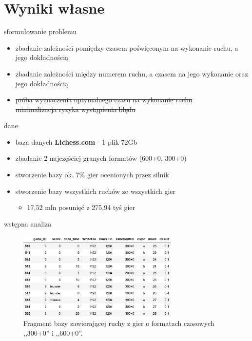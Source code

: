 \documentclass{beamer}
\begin{document}
\section{Wyniki własne}

\begin{frame}{sformułowanie problemu}
	\begin{itemize}
		\item zbadanie zależności pomiędzy czasem poświęconym na wykonanie ruchu, a jego dokładnością
		\item zbadanie zależności między numerem ruchu, a czasem na jego wykonanie oraz jego dokładnością
		\item \sout{próba wyznaczenia optymalnego czasu na wykonanie ruchu\\ minimalizacja ryzyka wystąpienia błędu} 
	\end{itemize}
\end{frame}

\begin{frame}{dane}
	\begin{itemize}
		\item baza danych \textbf{Lichess.com} - 1 plik 72Gb
		\item zbadanie 2 najczęściej granych formatów (600+0, 300+0)
		\item stworzenie bazy ok. 7\% gier ocenionych przez silnik
		\item stworzenie bazy wszystkich ruchów ze wszystkich gier
		\begin{itemize}
			\item 17,52 mln posunięć z 275,94 tyś gier
		\end{itemize}
	\end{itemize}
\end{frame}

\begin{frame}{wstępna analiza}
	\begin{figure}[H]
		\centering
		\includegraphics[width=8cm]{../Formatka/danee.png}
		\caption{Fragment bazy zawierającej ruchy z gier o formatach czasowych ,,300+0'' i ,,600+0''.}
		\label{rys:baza_ruchow}
	\end{figure}
\end{frame}
\end{document}
